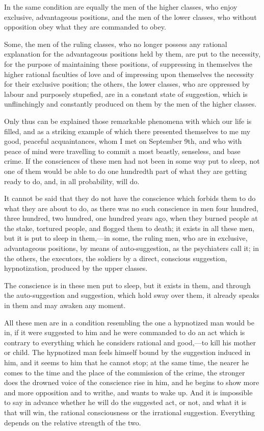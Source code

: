 \documentclass{book}
\begin{document}
In the same condition are equally the men of the higher classes, who enjoy exclusive, advantageous positions, and the men of the lower classes, who without opposition obey what they are commanded to obey.

Some, the men of the ruling classes, who no longer possess any rational explanation for the advantageous positions held by them, are put to the necessity, for the purpose of maintaining these positions, of suppressing in themselves the higher rational faculties of love and of impressing upon themselves the necessity for their exclusive position; the others, the lower classes, who are oppressed by labour and purposely stupefied, are in a constant state of suggestion, which is unflinchingly and constantly produced on them by the men of the higher classes.

Only thus can be explained those remarkable phenomena with which our life is filled, and as a striking example of which there presented themselves to me my good, peaceful acquaintances, whom I met on September 9th, and who with peace of mind were travelling to commit a most beastly, senseless, and base crime. If the consciences of these men had not been in some way put to sleep, not one of them would be able to do one hundredth part of what they are getting ready to do, and, in all probability, will do.

It cannot be said that they do not have the conscience which forbids them to do what they are about to do, as there was no such conscience in men four hundred, three hundred, two hundred, one hundred years ago, when they burned people at the stake, tortured people, and flogged them to death; it exists in all these men, but it is put to sleep in them,—in some, the ruling men, who are in exclusive, advantageous positions, by means of auto-suggestion, as the psychiaters call it; in the others, the executors, the soldiers by a direct, conscious suggestion, hypnotization, produced by the upper classes.

The conscience is in these men put to sleep, but it exists in them, and through the auto-suggestion and suggestion, which hold sway over them, it already speaks in them and may awaken any moment.

All these men are in a condition resembling the one a hypnotized man would be in, if it were suggested to him and he were commanded to do an act which is contrary to everything which he considers rational and good,—to kill his mother or child. The hypnotized man feels himself bound by the suggestion induced in him, and it seems to him that he cannot stop; at the same time, the nearer he comes to the time and the place of the commission of the crime, the stronger does the drowned voice of the conscience rise in him, and he begins to show more and more opposition and to writhe, and wants to wake up. And it is impossible to say in advance whether he will do the suggested act, or not, and what it is that will win, the rational consciousness or the irrational suggestion. Everything depends on the relative strength of the two.
\end{document}
